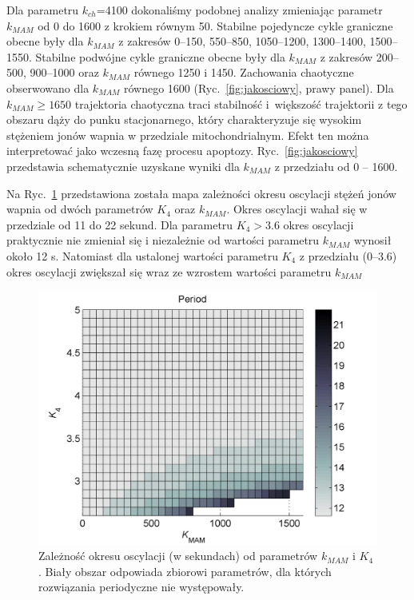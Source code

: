 Dla parametru $k_{ch}$=4100 dokonaliśmy podobnej analizy zmieniając  parametr $k_{MAM}$ od 0 do 1600 z krokiem równym 50. Stabilne pojedyncze cykle graniczne obecne były dla $k_{MAM}$ z zakresów 0--150, 550--850, 1050--1200, 1300--1400, 1500--1550.  Stabilne podwójne cykle graniczne obecne były dla $k_{MAM}$ z zakresów 200--500, 900--1000 oraz  $k_{MAM}$ równego 1250 i 1450. Zachowania chaotyczne obserwowano dla $k_{MAM}$ równego 1600 (Ryc.~\ref{fig:jakosciowy}, prawy panel). Dla $k_{MAM}\geq 1650$ trajektoria chaotyczna traci stabilność i~większość trajektorii z tego obszaru dąży do punku stacjonarnego, który charakteryzuje się wysokim stężeniem jonów wapnia w przedziale mitochondrialnym. Efekt ten można interpretować jako wczesną fazę procesu apoptozy. Ryc.~\ref{fig:jakosciowy} przedstawia schematycznie uzyskane wyniki dla $k_{MAM}$ z przedziału od 0 -- 1600.

Na Ryc.~\ref{fig:oscylacjeMo1} przedstawiona została mapa zależności okresu oscylacji stężeń jonów wapnia od dwóch parametrów $K_4$ oraz $k_{MAM}$. Okres oscylacji wahał się w przedziale od 11 do 22 sekund. Dla parametru  $K_4 > 3.6$ okres oscylacji praktycznie nie zmieniał się i niezależnie od wartości parametru $k_{MAM}$ wynosił około 12 s. Natomiast dla ustalonej wartości parametru $K_4$ z przedziału (0--3.6) okres oscylacji zwiększał się wraz ze wzrostem wartości parametru $k_{MAM}$

\begin{figure}[ht]
    \centering
    \includegraphics[width=1\textwidth]{rysunki/rozdzial_5/period}
    \caption[Zależność okresu oscylacji od parametrów $k_{MAM}$ i $K_4$]{Zależność okresu oscylacji (w sekundach) od parametrów $k_{MAM}$ i $K_4$ . Biały obszar odpowiada zbiorowi parametrów, dla których rozwiązania periodyczne nie występowały.}
    \label{fig:oscylacjeMo1}
\end{figure}

